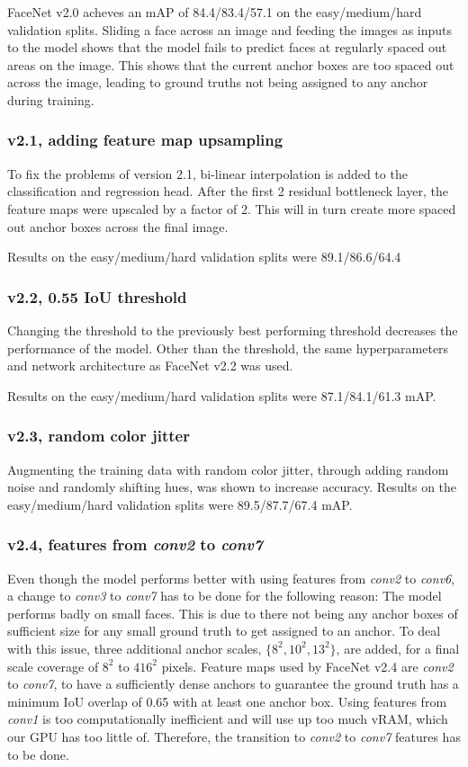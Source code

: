 \documentclass[a4paper, twoside]{article}
\begin{document}
FaceNet v2.0 acheves an mAP of 84.4/83.4/57.1 on the easy/medium/hard validation splits. Sliding a face across an image and feeding the images as inputs to the model shows that the model fails to predict faces at regularly spaced out areas on the image. This shows that the current anchor boxes are too spaced out across the image, leading to ground truths not being assigned to any anchor during training.

\subsubsection{v2.1, adding feature map upsampling}
To fix the problems of version 2.1, bi-linear interpolation is added to the classification and regression head. After the first 2 residual bottleneck layer, the feature maps were upscaled by a factor of 2. This will in turn create more spaced out anchor boxes across the final image.

Results on the easy/medium/hard validation splits were 89.1/86.6/64.4

\subsubsection{v2.2, 0.55 IoU threshold}
Changing the threshold to the previously best performing threshold decreases the performance of the model. Other than the threshold, the same hyperparameters and network architecture as FaceNet v2.2 was used.

Results on the easy/medium/hard validation splits were 87.1/84.1/61.3 mAP.

\subsubsection{v2.3, random color jitter}
Augmenting the training data with random color jitter, through adding random noise and randomly shifting hues, was shown to increase accuracy. Results on the easy/medium/hard validation splits were 89.5/87.7/67.4 mAP.

\subsubsection{v2.4, features from \textit{conv2} to \textit{conv7}}
Even though the model performs better with using features from \textit{conv2} to \textit{conv6}, a change to \textit{conv3} to \textit{conv7} has to be done for the following reason: The model performs badly on small faces. This is due to there not being any anchor boxes of sufficient size for any small ground truth to get assigned to an anchor. To deal with this issue, three additional anchor scales, $\{8^2, 10^2, 13^2\}$, are added, for a final scale coverage of $8^2$ to $416^2$ pixels. Feature maps used by FaceNet v2.4 are \textit{conv2} to \textit{conv7}, to have a sufficiently dense anchors to guarantee the ground truth has a minimum IoU overlap of 0.65 with at least one anchor box. Using features from \textit{conv1} is too computationally inefficient and will use up too much vRAM, which our GPU has too little of. Therefore, the transition to \textit{conv2} to \textit{conv7} features has to be done.
\end{document}
